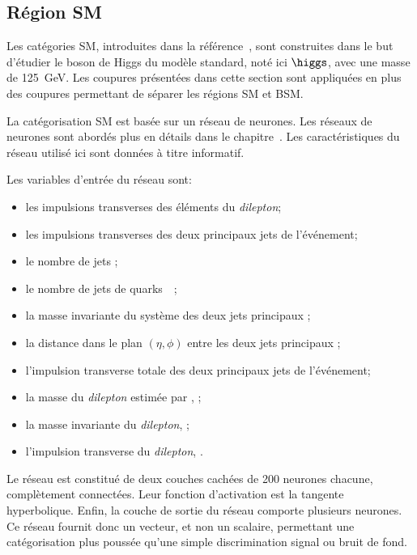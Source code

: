 \subsection{Région \og SM \fg{}}\label{chapter-HTT_analysis-section-categorisation-SM}
Les catégories SM, introduites dans la référence~\cite{CMS-PAS-HIG-19-010}, sont construites dans le but d'étudier le boson de Higgs du modèle standard, noté ici $\higgs$, avec une masse de \SI{125}{\GeV}.
Les coupures présentées dans cette section sont appliquées en plus des coupures permettant de séparer les régions SM et BSM.
\par %
La catégorisation SM est basée sur un réseau de neurones.
Les réseaux de neurones sont abordés plus en détails dans le chapitre~.
Les caractéristiques du réseau utilisé ici sont données à titre informatif.
\par
Les variables d'entrée du réseau sont:
\begin{itemize}
\item les impulsions transverses des éléments du \emph{dilepton};
\item les impulsions transverses des deux principaux jets de l'événement;
\item le nombre de jets \Njets;
\item le nombre de jets de quarks~\quarkb\ \Nbjets;
\item la masse invariante du système des deux jets principaux \mjj;
\item la distance dans le plan $(\eta,\phi)$ entre les deux jets principaux \Detajj;
\item l'impulsion transverse totale des deux principaux jets de l'événement;
\item la masse du \emph{dilepton} estimée par \SVFIT, \msv;
\item la masse invariante du \emph{dilepton}, \mvis;
\item l'impulsion transverse du \emph{dilepton}, \pTvis.
\end{itemize}
\par
Le réseau est constitué de deux couches cachées de 200 neurones chacune, complètement connectées.
Leur fonction d'activation est la tangente hyperbolique.
Enfin, la couche de sortie du réseau comporte plusieurs neurones.
Ce réseau fournit donc un vecteur, et non un scalaire, permettant une catégorisation plus poussée qu'une simple discrimination signal ou bruit de fond.

